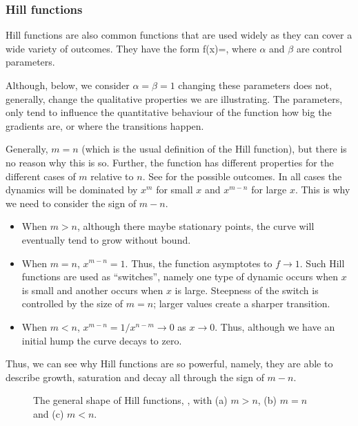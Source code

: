 \subsubsection{Hill functions}
Hill functions are also common functions that are used widely as they can cover a wide variety of outcomes. They have the form
\bb
f(x)=,\label{Hill_function}
\ee
where $\alpha$ and $\beta$ are control parameters.

Although, below, we consider $\alpha=\beta=1$ changing these parameters does not, generally, change the qualitative properties we are illustrating. The parameters, only tend to influence the quantitative behaviour of the function \eg how big the gradients are, or where the transitions happen. 

Generally, $m=n$ (which is the usual definition of the Hill function), but there is no reason why this is so. Further, the function has different properties for the different cases of $m$ relative to $n$. See  for the possible outcomes. In all cases the dynamics will be dominated by $x^m$ for small $x$ and $x^{m-n}$ for large $x$. This is why we need to consider the sign of $m-n$.
\begin{itemize}
\item When $m>n$, although there maybe stationary points, the curve will eventually tend to grow without bound.
\item When $m=n$, $x^{m-n}=1$. Thus, the function asymptotes to $f\rightarrow 1$. Such Hill functions are used as ``switches'', namely one type of dynamic occurs when $x$ is small and another occurs when $x$ is large. Steepness of the switch is controlled by the size of $m=n$; larger values create a sharper transition.
\item When $m<n$, $x^{m-n}=1/x^{n-m}\rightarrow 0$ as $x\rightarrow 0$. Thus, although we have an initial hump the curve decays to zero.
\end{itemize}
Thus, we can see why Hill functions are so powerful, namely, they are able to describe growth, saturation and decay all through the sign of $m-n$.


\begin{figure}[p!!!h!!!tbp]
\centering
{}
\caption{\label{Hill_functions} The general shape of Hill functions, , with (a) $m>n$, (b) $m=n$ and (c) $m<n$.}
\end{figure}

